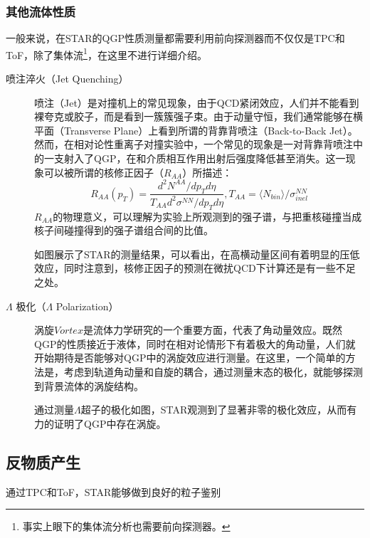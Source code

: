 \documentclass[%
 reprint,
 amsmath,amssymb,
 aps,
]{revtex4-1}
\begin{document}
\subsubsection{其他流体性质}
一般来说，在STAR的QGP性质测量都需要利用前向探测器而不仅仅是TPC和ToF，除了集体流\footnote{事实上眼下的集体流分析也需要前向探测器。}，在这里不进行详细介绍。
\begin{description}
    \item[喷注淬火（Jet Quenching）] 喷注（Jet）是对撞机上的常见现象，由于QCD紧闭效应，人们并不能看到裸夸克或胶子，而是看到一簇簇强子束。由于动量守恒，我们通常能够在横平面（Transverse Plane）上看到所谓的背靠背喷注（Back-to-Back Jet）。然而，在相对论性重离子对撞实验中，一个常见的现象是一对背靠背喷注中的一支射入了QGP，在和介质相互作用出射后强度降低甚至消失。这一现象可以被所谓的核修正因子（$R_{AA}$）所描述：
    \begin{equation}
        R_{AA}(p_T) = \frac{d^2 N^{AA}/dp_Td\eta}{T_{AA}d^2 \sigma^{NN}/dp_Td\eta},T_{AA} = \langle N_{bin} \rangle/\sigma^{NN}_{inel}
    \end{equation} 
    $R_{AA}$的物理意义，可以理解为实验上所观测到的强子谱，与把重核碰撞当成核子间碰撞得到的强子谱组合间的比值。

    如图展示了STAR的测量结果，可以看出，在高横动量区间有着明显的压低效应，同时注意到，核修正因子的预测在微扰QCD下计算还是有一些不足之处。
    \item[$\Lambda$ 极化（$\Lambda$ Polarization）] 涡旋$Vortex$是流体力学研究的一个重要方面，代表了角动量效应。既然QGP的性质接近于液体，同时在相对论情形下有着极大的角动量，人们就开始期待是否能够对QGP中的涡旋效应进行测量。在这里，一个简单的方法是，考虑到轨道角动量和自旋的耦合，通过测量末态的极化，就能够探测到背景流体的涡旋结构。
    
    通过测量$\Lambda$超子的极化如图，STAR观测到了显著非零的极化效应，从而有力的证明了QGP中存在涡旋。
\end{description}
\subsection{\label{sec:antimatter}反物质产生}
通过TPC和ToF，STAR能够做到良好的粒子鉴别
\end{document}
